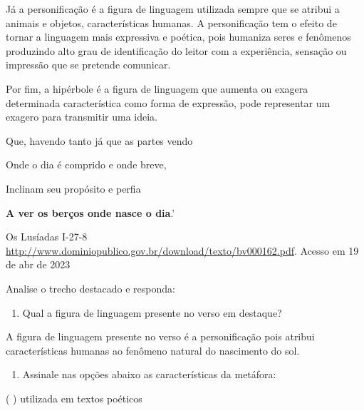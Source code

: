 {{Já a personificação é a figura de linguagem utilizada sempre que se
atribui a animais e objetos, características humanas. A personificação
tem o efeito de tornar a linguagem mais expressiva e poética, pois
humaniza seres e fenômenos produzindo alto grau de identificação do
leitor com a experiência, sensação ou impressão que se pretende
comunicar.

Por fim, a hipérbole é a figura de linguagem que aumenta ou exagera
determinada característica como forma de expressão, pode representar um
exagero para transmitir uma ideia.



Que, havendo tanto já que as partes vendo

Onde o dia é comprido e onde breve,

Inclinam seu propósito e perfia

\textbf{A ver os berços onde nasce o dia}.'

Os Lusíadas I-27-8
\href{http://www.dominiopublico.gov.br/download/texto/bv000162.pdf}{\uline{http://www.dominiopublico.gov.br/download/texto/bv000162.pdf}}.
Acesso em 19 de abr de 2023

Analise o trecho destacado e responda:

\begin{enumerate}
\def\labelenumi{\arabic{enumi})}
\tightlist
\item
  Qual a figura de linguagem presente no verso em destaque?
\end{enumerate}

A figura de linguagem presente no verso é a personificação pois atribui
características humanas ao fenômeno natural do nascimento do sol.

\begin{enumerate}
\def\labelenumi{\arabic{enumi})}
\setcounter{enumi}{1}
\tightlist
\item
  Assinale nas opções abaixo as características da metáfora:
\end{enumerate}

( ) utilizada em textos poéticos

}}
